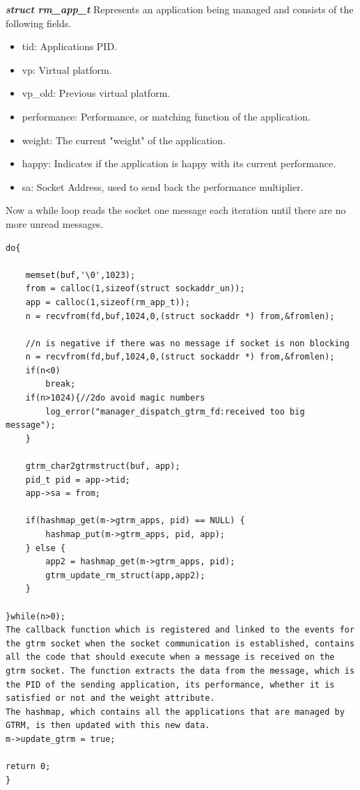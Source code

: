 \documentclass[nobiblatex]{LTHthesis}
\begin{document}
\begin{framed}
		\begin{flushleft}
			\textbf{\emph{struct rm\_app\_t}}
			Represents an application being managed and consists of the following fields.
			\begin{itemize}
			\item tid: Applications PID.
			\item vp: Virtual platform.
			\item vp\_old: Previous virtual platform.
			\item performance: Performance, or matching function of the application.
			\item weight: The current "weight" of the application.
			\item happy: Indicates if the application is happy with its current performance.
			\item sa: Socket Address, used to send back the performance multiplier.
			\end{itemize}
		\end{flushleft}	
\end{framed}






Now a while loop reads the socket one message each iteration until there are no more unread messages. 

\begin{verbatim}
do{		

	memset(buf,'\0',1023);
	from = calloc(1,sizeof(struct sockaddr_un));
	app = calloc(1,sizeof(rm_app_t));	
	n = recvfrom(fd,buf,1024,0,(struct sockaddr *) from,&fromlen);

	//n is negative if there was no message if socket is non blocking
	n = recvfrom(fd,buf,1024,0,(struct sockaddr *) from,&fromlen);
	if(n<0)
		break;
	if(n>1024){//2do avoid magic numbers
		log_error("manager_dispatch_gtrm_fd:received too big message");
	}	

	gtrm_char2gtrmstruct(buf, app);
	pid_t pid = app->tid;
	app->sa = from;

	if(hashmap_get(m->gtrm_apps, pid) == NULL) {
		hashmap_put(m->gtrm_apps, pid, app);
	} else {
		app2 = hashmap_get(m->gtrm_apps, pid);
		gtrm_update_rm_struct(app,app2);
	}															

}while(n>0);
The callback function which is registered and linked to the events for the gtrm socket when the socket communication is established, contains all the code that should execute when a message is received on the gtrm socket. The function extracts the data from the message, which is the PID of the sending application, its performance, whether it is satisfied or not and the weight attribute. 
The hashmap, which contains all the applications that are managed by GTRM, is then updated with this new data. 
m->update_gtrm = true;

return 0;
}
\end{verbatim}
\end{document}
